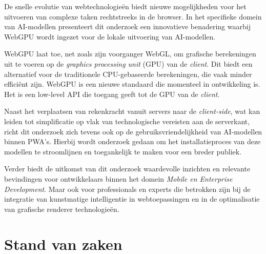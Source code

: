 \bigbreak{}
De snelle evolutie van webtechnologieën biedt nieuwe mogelijkheden voor het uitvoeren van complexe taken rechtstreeks in de browser. In het specifieke domein van AI-modellen presenteert dit onderzoek een innovatieve benadering waarbij WebGPU wordt ingezet voor de lokale uitvoering van AI-modellen.

\bigbreak{}
WebGPU laat toe, net zoals zijn voorganger WebGL, om grafische berekeningen uit te voeren op de \textit{graphics processing unit} (GPU) van de \textit{client}. Dit biedt een alternatief voor de traditionele CPU-gebaseerde berekeningen, die vaak minder efficiënt zijn. WebGPU is een nieuwe standaard die momenteel in ontwikkeling is. Het is een low-level API die toegang geeft tot de GPU van de \textit{client}.

\bigbreak{}
Naast het verplaatsen van rekenkracht vanuit servers naar de \textit{client-side}, wat kan leiden tot simplificatie op vlak van technologische vereisten aan de serverkant, richt dit onderzoek zich tevens ook op de gebruiksvriendelijkheid van AI-modellen binnen PWA's. Hierbij wordt onderzoek gedaan om het installatieproces van deze modellen te stroomlijnen en toegankelijk te maken voor een breder publiek.

\bigbreak{}
Verder biedt de uitkomst van dit onderzoek waardevolle inzichten en relevante bevindingen voor ontwikkelaars binnen het domein \textit{Mobile en Enterprise Development}. Maar ook voor professionals en experts die betrokken zijn bij de integratie van kunstmatige intelligentie in webtoepassingen en in de optimalisatie van grafische renderer technologieën.

\newpage

\section{Stand van zaken}%
\label{sec:stand van zaken}



